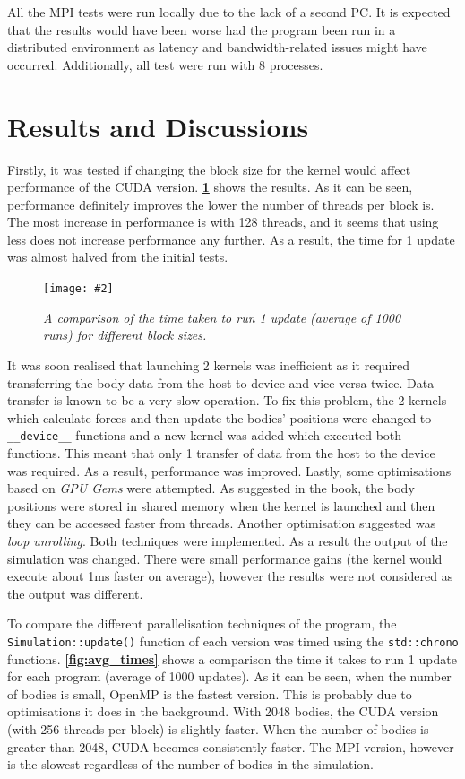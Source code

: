 \documentclass[12pt, a4paper]{article}
\newcommand{\figuremacro}[5]{
    \begin{figure}[#1]
        \centering
        \caption[#3]{\textbf{#3}#4}
        \texttt{[image: \#2]}
        \label{fig:#2}
    \end{figure}
}
\begin{document}
    All the MPI tests were run locally due to the lack of a second PC. It is expected that the results would have been worse had the program been run in a distributed environment as latency and bandwidth-related issues might have occurred. Additionally, all test were run with 8 processes.

    \section{Results and Discussions\label{sec:results}}
    Firstly, it was tested if changing the block size for the kernel would affect performance of the CUDA version. \textbf{\cref{fig:threads_cuda}} shows the results. As it can be seen, performance definitely improves the lower the number of threads per block is. The most increase in performance is with 128 threads, and it seems that using less does not increase performance any further. As a result, the time for 1 update was almost halved from the initial tests. 

    \figuremacro{h}{threads_cuda}{}{\small{\textit{A comparison of the time taken to run 1 update (average of 1000 runs) for different block sizes.}}}{1}

    It was soon realised that launching 2 kernels was inefficient as it required transferring the body data from the host to device and vice versa twice. Data transfer is known to be a very slow operation. To fix this problem, the 2 kernels which calculate forces and then update the bodies' positions were changed to \texttt{\_\_device\_\_} functions and a new kernel was added which executed both functions. This meant that only 1 transfer of data from the host to the device was required. As a result, performance was improved. Lastly, some optimisations based on \textit{GPU Gems} \cite{Nguyen:2007} were attempted. As suggested in the book, the body positions were stored in shared memory when the kernel is launched and then they can be accessed faster from threads. Another optimisation suggested was \textit{loop unrolling}. Both techniques were implemented. As a result the output of the simulation was changed. There were small performance gains (the kernel would execute about 1ms faster on average), however the results were not considered as the output was different.

    To compare the different parallelisation techniques of the program, the \texttt{Simulation::update()} function of each version was timed using the \texttt{std::chrono} functions. \textbf{\cref{fig:avg_times}} shows a comparison the time it takes to run 1 update for each program (average of 1000 updates). As it can be seen, when the number of bodies is small, OpenMP is the fastest version. This is probably due to optimisations it does in the background. With 2048 bodies, the CUDA version (with 256 threads per block) is slightly faster. When the number of bodies is greater than 2048, CUDA becomes consistently faster. The MPI version, however is the slowest regardless of the number of bodies in the simulation.
\end{document}
